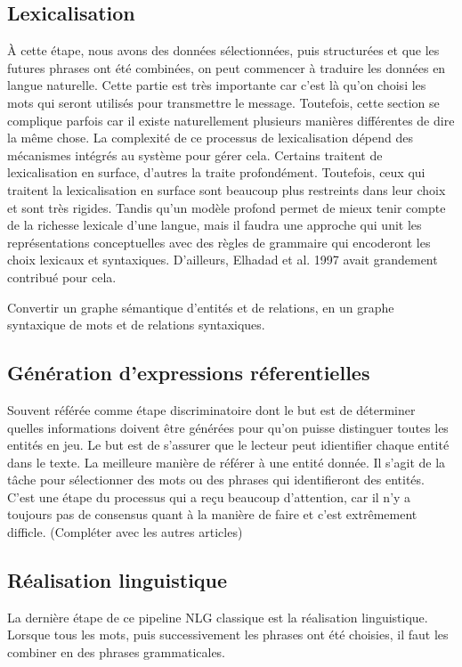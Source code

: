 \subsection{Lexicalisation}
À cette étape, nous avons des données sélectionnées, puis structurées et que les futures phrases ont été combinées, on peut commencer à traduire les données en langue naturelle. Cette partie est très importante car c'est là qu'on choisi les mots qui seront utilisés pour transmettre le message. Toutefois, cette section se complique parfois car il existe naturellement plusieurs manières différentes de dire la même chose. La complexité de ce processus de lexicalisation dépend des mécanismes intégrés au système pour gérer cela. Certains traitent de lexicalisation en surface, d'autres la traite profondément. Toutefois, ceux qui traitent la lexicalisation en surface sont beaucoup plus restreints dans leur choix et sont très rigides. Tandis qu'un modèle profond permet de mieux tenir compte de la richesse lexicale d'une langue, mais il faudra une approche qui unit les représentations conceptuelles avec des règles de grammaire qui encoderont les choix lexicaux et syntaxiques. D'ailleurs, Elhadad et al. 1997 avait grandement contribué pour cela.

Convertir un graphe sémantique d'entités et de relations, en un graphe syntaxique de mots et de relations syntaxiques. 

\subsection{Génération d'expressions réferentielles}
Souvent référée comme étape discriminatoire dont le but est de déterminer quelles informations doivent être générées pour qu'on puisse distinguer toutes les entités en jeu. Le but est de s'assurer que le lecteur peut idientifier chaque entité dans le texte. La meilleure manière de référer à une entité donnée.
Il s'agit de la tâche pour sélectionner des mots ou des phrases qui identifieront des entités. C'est une étape du processus qui a reçu beaucoup d'attention, car il n'y a toujours pas de consensus quant à la manière de faire et c'est extrêmement difficle. (Compléter avec les autres articles)

\subsection{Réalisation linguistique}
La dernière étape de ce pipeline NLG classique est la réalisation linguistique. Lorsque tous les mots, puis successivement les phrases ont été choisies, il faut les combiner en des phrases grammaticales. 

